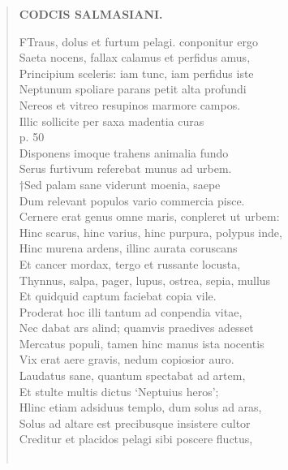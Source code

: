 \documentclass[11pt, a4paper]{report}
\begin{document}
\begin{verse}
    \begin{center} \textbf{CODCIS SALMASIANI.} \end{center} \marginpar{[87]} FTraus, dolus et furtum pelagi. conponitur ergo \\ Saeta nocens, fallax calamus et perfidus amus, \\ Principium sceleris: iam tunc, iam perfidus iste \\ Neptunum spoliare parans petit alta profundi \\ Nereos et vitreo resupinos marmore campos. \\ Illic sollicite  \lbrack per \rbrack  saxa madentia curas \\ p. 50 \\ Disponens imoque trahens animalia fundo \\ Serus furtivum referebat munus ad urbem. \\ †Sed palam sane viderunt moenia, saepe \\ Dum relevant populos vario commercia pisce. \\ Cernere erat genus omne maris, conpleret ut urbem: \\ Hinc scarus, hinc varius, hinc purpura, polypus inde, \\ Hinc murena ardens, illinc aurata coruscans \\ Et cancer mordax, tergo et russante locusta, \\ Thynnus, salpa, pager, lupus, ostrea, sepia, mullus \\ Et quidquid captum faciebat copia vile. \\ Proderat hoc illi tantum ad conpendia vitae, \\ Nec dabat ars alind; quamvis praedives adesset \\ Mercatus populi, tamen hinc manus ista nocentis \\ Vix erat aere gravis, nedum copiosior auro. \\ Laudatus sane, quantum spectabat ad artem, \\ Et stulte multis dictus ‘Neptuius heros’; \\ Hlinc etiam adsiduus templo, dum solus ad aras, \\ Solus ad altare est precibusque insistere cultor \\ Creditur et placidos pelagi sibi poscere fluctus, \\ 
        ﻿\pagebreak 

\end{verse}
\end{document}
